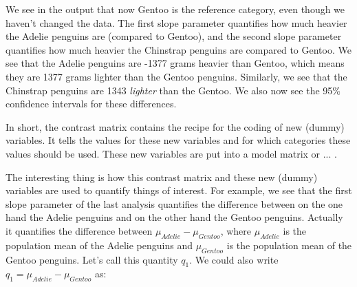 \begin{knitrout}
\color{fgcolor}
\end{knitrout}

We see in the output that now Gentoo is the reference category, even though we haven't changed the data. The first slope parameter quantifies how much heavier the Adelie penguins are (compared to Gentoo), and the second slope parameter quantifies how much heavier the Chinstrap penguins are compared to Gentoo. We see that the Adelie penguins are -1377 grams heavier than Gentoo, which means they are 1377 grams lighter than the Gentoo penguins. Similarly, we see that the Chinstrap penguins are 1343 \textit{lighter} than the Gentoo. We also now see the 95\% confidence intervals for these differences.


In short, the contrast matrix contains the recipe for the coding of new (dummy) variables. It tells the values for these new variables and for which categories these values should be used. These new variables are put into a model matrix or ... . 

The interesting thing is how this contrast matrix and these new (dummy) variables are used to quantify things of interest. For example, we see that the first slope parameter of the last analysis quantifies the difference between on the one hand the Adelie penguins and on the other hand the Gentoo penguins. Actually it quantifies the difference between $\mu_{Adelie}   - \mu_{Gentoo}$, where $\mu_{Adelie}$ is the population mean of the Adelie penguins and $\mu_{Gentoo}$ is the population mean of the Gentoo penguins. Let's call this quantity $q_1$. We could also write $q_1 = \mu_{Adelie}   - \mu_{Gentoo}$ as:




